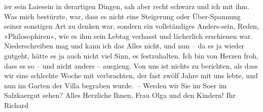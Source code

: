 \begin{ledgroupsized}[t]{13cm}
                  i{\geminationm}er sein Laiesein in derartigen Dingen, sah aber
               recht schwarz {\pb}und ich mit ihm. Was
               mich bestürzte, war, dass es nicht eine Steigerung oder Über-Spannung seiner
               sonstigen Art zu denken war, sondern ein vollständiges Anders-sein, Reden,
               »Philosophiren«, wie es ihm sein Lebtag verhasst und lächerlich erschienen war.
               Niederschreiben mag und kann ich das Alles nicht, und nun – da es ja wieder gutgeht,
               hätte es ja auch nicht viel Sinn, es festzuhalten.\pend
           \pstart
           Ich bin von Herzen froh, dass es so – und nicht anders – ausgieng.\pend
           \pstart
           Von uns ist nichts zu berichten, als dass wir eine schlechte Woche mit \label{KLL02266_AS-1v}\label{KLL02266_AS-1h}
               verbrachten, der fast zwölf Jahre mit uns lebte, und nun im Garten der Villa begraben
               wurde. –\pend
           \pstart
           Werden wir Sie im So{\geminationm}er im Salzka{\geminationm}ergut sehen?\pend
           \pstart
           Alles Herzliche Ihnen, Frau Olga und den Kindern! Ihr\pend
           \pstart \spacefill\mbox{Richard}\pend{}\endnumbering{}\end{ledgroupsized}  \newcommand{\dateiname}{L02266}\newcommand{\titel}{Richard Beer-Hofmann an Arthur Schnitzler, 18. 7. 1917}\newcommand{\editorInnen}{Martin Anton Müller und Gerd-Hermann Susen}
            \footnotesize
\begin{ledgroupsized}[t]{11.5cm}
\end{ledgroupsized}
         
      